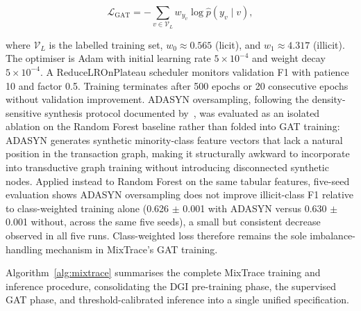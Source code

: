 \documentclass[12pt,a4paper]{article}
\begin{document}
\begin{equation}
  \mathcal{L}_\text{GAT}
    = -\sum_{v \in \mathcal{V}_L}
      w_{y_v} \log \hat{p}(y_v \mid v),
  \label{eq:loss}
\end{equation}

where $\mathcal{V}_L$ is the labelled training set,
$w_0 \approx 0.565$ (licit), and $w_1 \approx 4.317$
(illicit). The optimiser is Adam with initial learning
rate $5 \times 10^{-4}$ and weight decay $5 \times 10^{-4}$.
A ReduceLROnPlateau scheduler monitors validation F1
with patience 10 and factor 0.5. Training terminates
after 500 epochs or 20 consecutive epochs without
validation improvement. ADASYN oversampling, following the
density-sensitive synthesis protocol documented
by~\citep{ileberi2024}, was evaluated as an isolated
ablation on the Random Forest baseline rather than folded
into GAT training: ADASYN generates synthetic minority-class
feature vectors that lack a natural position in the
transaction graph, making it structurally awkward to
incorporate into transductive graph training without
introducing disconnected synthetic nodes. Applied instead to
Random Forest on the same tabular features, five-seed
evaluation shows ADASYN oversampling does not improve
illicit-class F1 relative to class-weighted training alone
(0.626 $\pm$ 0.001 with ADASYN versus 0.630 $\pm$ 0.001
without, across the same five seeds), a small but consistent
decrease observed in all five runs. Class-weighted loss
therefore remains the sole imbalance-handling mechanism in
MixTrace's GAT training.

Algorithm~\ref{alg:mixtrace} summarises the complete
MixTrace training and inference procedure, consolidating
the DGI pre-training phase, the supervised GAT phase, and
threshold-calibrated inference into a single unified
specification.
\end{document}
